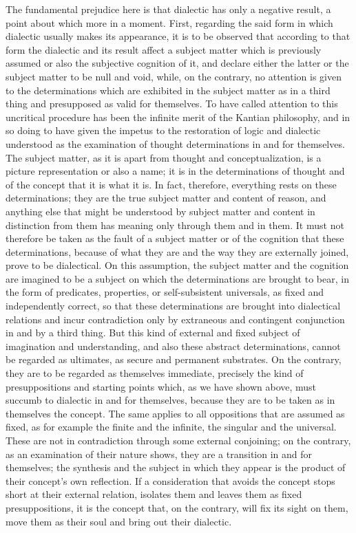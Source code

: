 The fundamental prejudice here is that
dialectic has only a negative result,
a point about which more in a moment.
First, regarding the said form in which dialectic
usually makes its appearance,
it is to be observed that according to that form
the dialectic and its result affect
a subject matter which is previously assumed
or also the subjective cognition of it,
and declare either the latter or the subject matter
to be null and void,
while, on the contrary, no attention is given to
the determinations which are exhibited in the subject matter
as in a third thing and presupposed as valid for themselves.
To have called attention to this uncritical procedure has
been the infinite merit of the Kantian philosophy,
and in so doing to have given the impetus to the restoration
of logic and dialectic understood as the examination of
thought determinations in and for themselves.
The subject matter, as it is apart from thought and conceptualization,
is a picture representation or also a name;
it is in the determinations of thought and of the concept
that it is what it is.
In fact, therefore, everything rests on these determinations;
they are the true subject matter and content of reason,
and anything else that might be understood by subject matter and content
in distinction from them has meaning only through them and in them.
It must not therefore be taken as the fault of a subject matter
or of the cognition that these determinations,
because of what they are and the way they are externally joined,
prove to be dialectical.
On this assumption, the subject matter and the cognition
are imagined to be a subject on which
the determinations are brought to bear,
in the form of predicates, properties,
or self-subsistent universals,
as fixed and independently correct,
so that these determinations are
brought into dialectical relations
and incur contradiction only by
extraneous and contingent conjunction
in and by a third thing.
But this kind of external and fixed
subject of imagination and understanding,
and also these abstract determinations,
cannot be regarded as ultimates,
as secure and permanent substrates.
On the contrary, they are to be regarded as themselves immediate,
precisely the kind of presuppositions and starting points which,
as we have shown above, must succumb to dialectic in and for themselves,
because they are to be taken as in themselves the concept.
The same applies to all oppositions that are assumed as fixed,
as for example the finite and the infinite, the singular and the universal.
These are not in contradiction through some external conjoining;
on the contrary, as an examination of their nature shows,
they are a transition in and for themselves;
the synthesis and the subject in which they appear is
the product of their concept's own reflection.
If a consideration that avoids
the concept stops short at their external relation,
isolates them and leaves them as fixed presuppositions,
it is the concept that,  on the contrary,
will fix its sight on them,
move them as their soul and bring out their dialectic.

